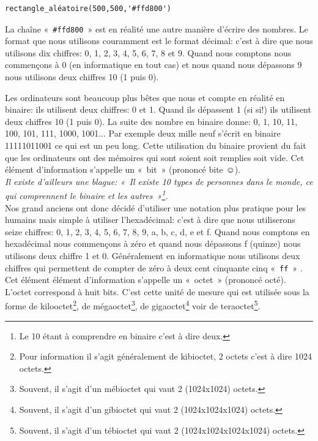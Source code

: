 \begin{Verbatim}[frame=single,rulecolor=\color{mbleu}, label=à taper]
rectangle_aléatoire(500,500,'#ffd800')
\end{Verbatim}

La chaîne « \texttt{\#ffd800} » est en réalité une autre manière d'écrire des nombres.
Le format que nous utilisons couramment est le format décimal: c'est à dire que nous utilisons dix chiffres: 0, 1, 2, 3, 4, 5, 6, 7, 8 et 9. Quand nous comptons nous commençons à 0 (en informatique en tout cas) et nous quand nous dépassons 9 nous utilisons deux chiffres 10 (1 puis 0).

Les ordinateurs sont beaucoup plus bêtes que nous et compte en réalité en binaire: ils utilisent deux chiffres: 0 et 1. Quand ils dépassent 1 (si si!) ils utilisent deux chiffres 10 (1 puis 0). La suite des nombre en binaire donne: 0, 1, 10, 11, 100, 101, 111, 1000, 1001... Par exemple deux mille neuf s'écrit en binaire 11111011001 ce qui est un peu long. Cette utilisation du binaire provient du fait que les ordinateurs ont des mémoires qui sont soient soit remplies soit vide. Cet élément d'information s'appelle un « bit » (prononcé bite ☺).\\

\emph{Il existe d'ailleurs une blague: « Il existe \emph{10} types de personnes dans le monde, ce qui comprennent le binaire et les autres »\footnote{Le 10 étant à comprendre en binaire c'est à dire deux.}.}\\


Nos grand anciens ont donc décidé d'utiliser une notation plus pratique pour les humains mais simple à utiliser l'hexadécimal: c'est à dire que nous utiliserons seize chiffres: 0, 1, 2, 3, 4, 5, 6, 7, 8, 9, a, b, c, d, e et f. Quand nous comptons en hexadécimal nous commençons à zéro et quand nous dépassons f (quinze) nous utilisons deux chiffre 1 et 0. Généralement en informatique nous utilisons deux chiffres qui permettent de compter de zéro à deux cent cinquante cinq « \texttt{ff} » .
Cet élément élément d'information s'appelle un « octet » (prononcé octé). L'octet correspond à huit bits. C'est cette unité de mesure qui est utilisée sous la forme de kilooctet\footnote{Pour information il s'agit généralement de kibioctet, 2 octets c'est à dire 1024 octets.}, de mégaoctet\footnote{Souvent, il s'agit d'un mébioctet qui vaut 2 (1024\textsf{x}1024) octets.}, de gigaoctet\footnote{Souvent, il s'agit d'un gibioctet qui vaut 2 (1024\textsf{x}1024\textsf{x}1024) octets.} voir de teraoctet\footnote{Souvent, il s'agit d'un tébioctet qui vaut 2 (1024\textsf{x}1024\textsf{x}1024\textsf{x}1024) octets.}.

